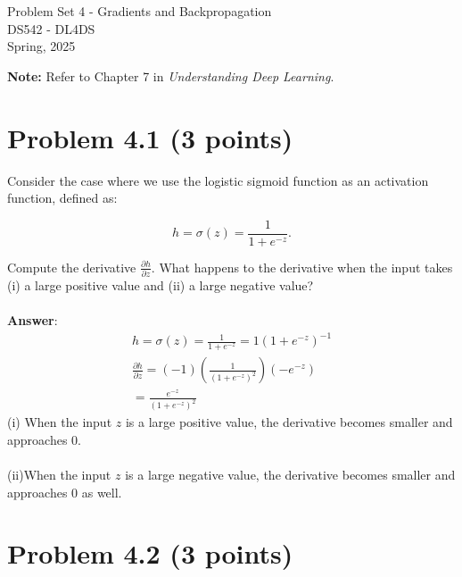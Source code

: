 \documentclass[10pt]{article}
\begin{document}
\begin{center}
    \LARGE {Problem Set 4 - Gradients and Backpropagation} \\[1em]
    \Large{DS542 - DL4DS} \\[0.5em]
    \large Spring, 2025
\end{center}

\vspace{2em}

\noindent\textbf{Note:} Refer to Chapter 7 in \textit{Understanding Deep Learning}.

\vspace{2em}

\section*{Problem 4.1 (3 points)}

Consider the case where we use the logistic sigmoid function as an activation function, defined as:

\begin{equation}
h = \sigma(z) = \frac{1}{1 + e^{-z}}.
\end{equation}

\noindent Compute the derivative \( \frac{\partial h}{\partial z} \). What happens
to the derivative when the input takes (i) a large positive value and (ii) a large negative value? \\ \\ 

\textbf{Answer}:  
\begin{align*}
    h = \sigma(z) = \frac{1}{1 + e^{-z}} = 1(1 + e^{-z})^{-1} \\ 
    \frac{\partial h}{\partial z} = (-1)\left( \frac{1}{(1 + e^{-z})^{2}}\right)(-e^{-z}) \\
    = \frac{e^{-z}}{(1 + e^{-z})^{2}}
\end{align*}
(i) When the input $z$ is a large positive value, the derivative becomes smaller and approaches 0. \\ \\ 
(ii)When the input $z$ is a large negative value, the derivative becomes smaller and approaches 0 as well.
\vspace{5em}
\vspace{5em}

\section*{Problem 4.2 (3 points)}
\end{document}

